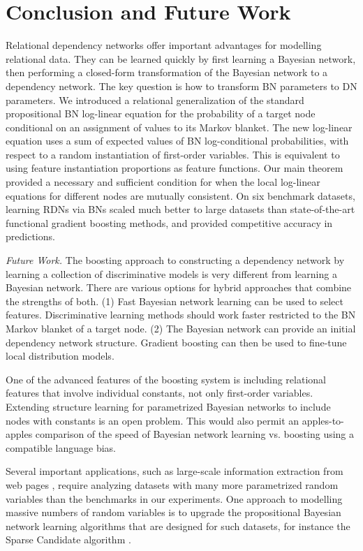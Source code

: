\documentclass[runningheads,a4paper]{llncs}
\begin{document}
\section{Conclusion and Future Work} 
\label{sec:conclusion}
Relational dependency networks offer important advantages for modelling relational data. They can be learned quickly by first learning a Bayesian network, then performing a closed-form transformation of the Bayesian network to a dependency network. The key question is how to transform BN parameters to DN parameters. We introduced a relational generalization of the standard propositional BN log-linear equation for the probability of a target node conditional on an assignment of values to its Markov blanket. The new log-linear equation uses a sum of expected values of BN log-conditional probabilities, with respect to a random instantiation of first-order variables. This is equivalent to using feature instantiation proportions as feature functions.  Our main theorem provided a necessary and sufficient condition for when the local log-linear equations for different nodes are mutually consistent. On six benchmark datasets, learning RDNs via BNs scaled much better to large datasets than state-of-the-art functional gradient boosting methods, and provided competitive accuracy in predictions.

{\em Future Work.}
The boosting approach to constructing a dependency network by learning a collection of discriminative models is very different from learning a Bayesian network. There are various options for hybrid approaches that combine the strengths of both. (1) Fast Bayesian network learning can be used to select features. Discriminative learning methods should work faster restricted to the BN Markov blanket of a target node. (2) The Bayesian network can provide an initial dependency network structure. Gradient boosting can then be used to fine-tune local distribution models. 

One of the advanced features of the boosting system is including relational features that involve individual constants, not only first-order variables. Extending structure learning for parametrized Bayesian networks to include nodes with constants is an open problem. 
This would also permit an apples-to-apples comparison of the speed of Bayesian network learning vs. boosting using a compatible language bias.

Several important applications, such as large-scale information extraction from web pages \cite{Zhang2015}, require analyzing datasets with many more parametrized random variables than the benchmarks in our experiments. One approach to modelling massive numbers of random variables is to upgrade the propositional Bayesian network learning algorithms that are designed for such datasets, for instance the Sparse Candidate algorithm \cite{friedman99:_learn_bayes}. 
\end{document}
